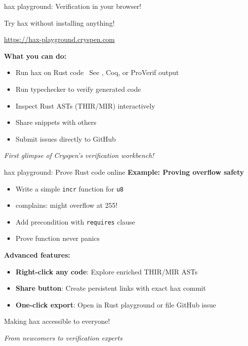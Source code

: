 \documentclass[aspectratio=169, lualatex, handout]{beamer}
\begin{document}
\begin{frame}{hax playground: Verification in your browser!}
	\begin{center}
		\Large
		Try hax without installing anything!

		\vspace{0.5em}

		\url{https://hax-playground.cryspen.com}
	\end{center}
	\vspace{1em}
	\textbf{What you can do:}
	\begin{itemize}
		\item Run hax on Rust code \rightarrow\ See \fstar, Coq, or ProVerif output
		\item Run \fstar typechecker to verify generated code
		\item Inspect Rust ASTs (THIR/MIR) interactively
		\item Share snippets with others
		\item Submit issues directly to GitHub
	\end{itemize}
	\vspace{0.5em}
	\begin{center}
		\textit{First glimpse of Cryspen's verification workbench!}
	\end{center}
\end{frame}

\begin{frame}{hax playground: Prove Rust code online}
	\textbf{Example: Proving overflow safety}
	\begin{itemize}
		\item Write a simple \texttt{incr} function for \texttt{u8}
		\item \fstar complains: might overflow at 255!
		\item Add precondition with \texttt{requires} clause
		\item Prove function never panics \mycheckmark
	\end{itemize}
	\vspace{0.5em}
	\textbf{Advanced features:}
	\begin{itemize}
		\item \textbf{Right-click any code}: Explore enriched THIR/MIR ASTs
		\item \textbf{Share button}: Create persistent links with exact hax commit
		\item \textbf{One-click export}: Open in Rust playground or file GitHub issue
	\end{itemize}
	\vspace{0.5em}
	\begin{center}
		\Large
		Making hax accessible to everyone!

		\vspace{0.5em}

		\normalsize
		\textit{From newcomers to verification experts}
	\end{center}
\end{frame}
\end{document}
